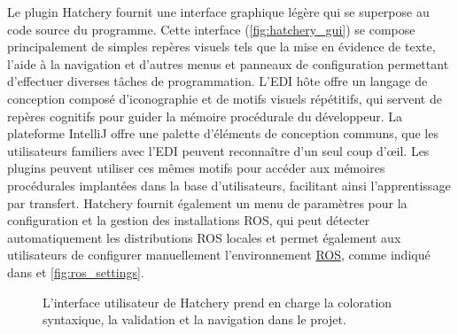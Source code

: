 Le plugin Hatchery fournit une interface graphique légère qui se superpose au code source du programme. Cette interface (\autoref{fig:hatchery_gui}) se compose principalement de simples repères visuels tels que la mise en évidence de texte, l'aide à la navigation et d'autres menus et panneaux de configuration permettant d'effectuer diverses tâches de programmation. L'EDI hôte offre un langage de conception composé d'iconographie et de motifs visuels répétitifs, qui servent de repères cognitifs pour guider la mémoire procédurale du développeur. La plateforme IntelliJ offre une palette d'éléments de conception communs, que les utilisateurs familiers avec l'EDI peuvent reconnaître d'un seul coup d'œil. Les plugins peuvent utiliser ces mêmes motifs pour accéder aux mémoires procédurales implantées dans la base d'utilisateurs, facilitant ainsi l'apprentissage par transfert. Hatchery fournit également un menu de paramètres pour la configuration et la gestion des installations ROS, qui peut détecter automatiquement les distributions ROS locales et permet également aux utilisateurs de configurer manuellement l'environnement \href{https://wiki.ros.org/ROS/Tutorials/InstallingandConfiguringROSEnvironment}{ROS}, comme indiqué dans et \autoref{fig:ros_settings}.
%
\begin{figure}[b]
\centering
{}
\caption{L'interface utilisateur de Hatchery prend en charge la coloration syntaxique, la validation et la navigation dans le projet.}
\label{fig:hatchery_gui}
\end{figure}
%

